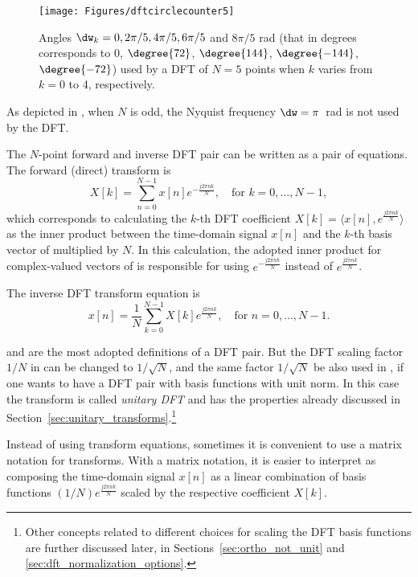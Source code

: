\begin{figure}[!htb]
        \centering
                \texttt{[image: Figures/dftcirclecounter5]}
        \caption{Angles $\dw_k=0, 2\pi/5, 4\pi/5, 6\pi/5$ and $8\pi/5$ rad (that in degrees corresponds to $0$, $\degree{72}$, $\degree{144}$, $\degree{-144}$, $\degree{-72}$) used by a DFT of $N=5$ points when $k$ varies from $k=0$ to 4, respectively.\label{fig:dftcirclecounter5}}				
\end{figure}

As depicted in , when $N$ is odd, the Nyquist frequency $\dw = \pi$~rad is not
used by the DFT.

The $N$-point forward and inverse DFT pair can be written as a pair of equations. 
The forward (direct) transform is
\begin{equation}
        X[k] = \sum_{n=0}^{N-1} x[n] e^{-\frac{j 2 \pi n k}{N}},\textrm{~~~for~} k=0, \ldots, N-1,
        \label{eq:dft_long}
\end{equation}
which corresponds to calculating the $k$-th DFT coefficient $X[k]=\langle x[n],  e^{\frac{j 2 \pi n k}{N}} \rangle$ as the inner product between
the time-domain signal $x[n]$ and the $k$-th basis vector of  multiplied by $N$. In this
calculation, the adopted inner product for complex-valued
vectors of  is responsible for  using $e^{-\frac{j 2 \pi n k}{N}}$ instead of $e^{\frac{j 2 \pi n k}{N}}$.

The inverse DFT transform equation is
\begin{equation}
        x[n] = \frac{1}{N} \sum_{k=0}^{N-1} X[k] e^{\frac{j 2 \pi n k}{N}},\textrm{~~~for~} n=0, \ldots, N-1.
        \label{eq:idft_long}
\end{equation}

 and  are the most adopted definitions of a DFT pair. But the DFT scaling factor $1/N$ in  can be changed to $1/\sqrt{N}$, and the same factor $1/\sqrt{N}$ be also used in , if one wants to have a DFT pair with basis functions with unit norm. In this case the transform is called \emph{unitary DFT} and has the
properties already discussed in Section~\ref{sec:unitary_transforms}.\footnote{Other concepts related to different choices for scaling the DFT basis functions are further discussed later, in Sections~\ref{sec:ortho_not_unit} and \ref{sec:dft_normalization_options}.}

Instead of using transform equations, sometimes it is convenient to use a matrix notation for transforms. 
With a matrix notation, it is easier to interpret  as composing the time-domain
signal $x[n]$ as a linear combination of basis functions $(1/N)e^{\frac{j 2 \pi n k}{N}}$ scaled by
the respective coefficient $X[k]$.

